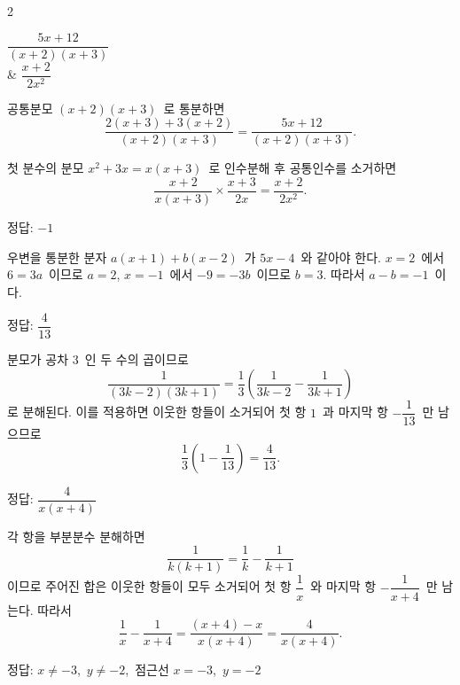 \documentclass[10pt,fleqn]{article}
\begin{document}
\begin{multicols*}{2}

\begin{dmanslist}
 $\dfrac{5x+12}{(x+2)(x+3)}$ \\
&  $\dfrac{x+2}{2x^{2}}$
\end{dmanslist}

 공통분모 $(x+2)(x+3)$\ 로 통분하면
\[ \dfrac{2(x+3)+3(x+2)}{(x+2)(x+3)}=\dfrac{5x+12}{(x+2)(x+3)}. \]

 첫 분수의 분모 $x^{2}+3x=x(x+3)$\ 로 인수분해 후 공통인수를 소거하면
\[ \dfrac{x+2}{x(x+3)}\times\dfrac{x+3}{2x}=\dfrac{x+2}{2x^{2}}. \]

\begin{dmanswerbox}
정답: $-1$
\end{dmanswerbox}

우변을 통분한 분자 $a(x+1)+b(x-2)$\ 가 $5x-4$\ 와 같아야 한다. $x=2$\ 에서 $6=3a$\ 이므로 $a=2$, $x=-1$\ 에서 $-9=-3b$\ 이므로 $b=3$. 따라서 $a-b=-1$\ 이다.
\begin{dmanswerbox}
정답: $\dfrac{4}{13}$
\end{dmanswerbox}

분모가 공차 $3$\ 인 두 수의 곱이므로
\[ \dfrac{1}{(3k-2)(3k+1)}=\dfrac{1}{3}\!\left(\dfrac{1}{3k-2}-\dfrac{1}{3k+1}\right) \]
로 분해된다. 이를 적용하면 이웃한 항들이 소거되어 첫 항 $1$\ 과 마지막 항 $-\dfrac{1}{13}$\ 만 남으므로
\[ \dfrac{1}{3}\!\left(1-\dfrac{1}{13}\right)=\dfrac{4}{13}. \]

\begin{dmanswerbox}
정답: $\dfrac{4}{x(x+4)}$
\end{dmanswerbox}

각 항을 부분분수 분해하면
\[ \dfrac{1}{k(k+1)}=\dfrac{1}{k}-\dfrac{1}{k+1} \]
이므로 주어진 합은 이웃한 항들이 모두 소거되어 첫 항 $\dfrac{1}{x}$\ 와 마지막 항 $-\dfrac{1}{x+4}$\ 만 남는다. 따라서
\[ \dfrac{1}{x}-\dfrac{1}{x+4}=\dfrac{(x+4)-x}{x(x+4)}=\dfrac{4}{x(x+4)}. \]

\begin{dmanswerbox}
정답: $x\ne -3$,\ $y\ne -2$,\ 점근선 $x=-3$,\ $y=-2$
\end{dmanswerbox}


\end{multicols*}
\end{document}
